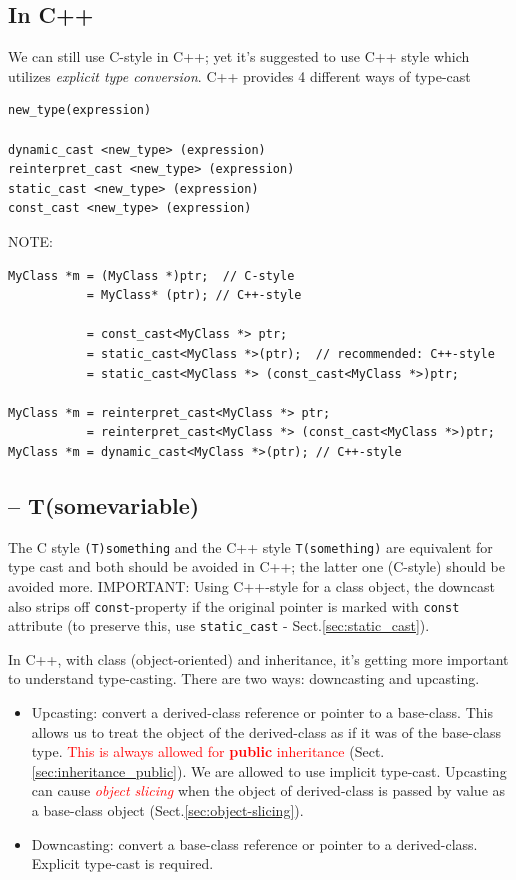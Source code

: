\subsection{In C++}
\label{sec:type-cast-C++}

We can still use C-style in C++; yet it's suggested to use C++ style which
utilizes {\it explicit type conversion}. C++ provides 4 different ways of
type-cast
\begin{Verbatim}
new_type(expression)
    
dynamic_cast <new_type> (expression)
reinterpret_cast <new_type> (expression)
static_cast <new_type> (expression)
const_cast <new_type> (expression)
 \end{Verbatim}

NOTE:
\begin{Verbatim}
MyClass *m = (MyClass *)ptr;  // C-style
           = MyClass* (ptr); // C++-style

           = const_cast<MyClass *> ptr; 
           = static_cast<MyClass *>(ptr);  // recommended: C++-style 
           = static_cast<MyClass *> (const_cast<MyClass *>)ptr;
           
MyClass *m = reinterpret_cast<MyClass *> ptr;
           = reinterpret_cast<MyClass *> (const_cast<MyClass *>)ptr;
MyClass *m = dynamic_cast<MyClass *>(ptr); // C++-style
\end{Verbatim}

\subsection{-- T(somevariable)}

The C style \verb!(T)something! and the C++ style \verb!T(something)! are
equivalent for type cast and both should be avoided in C++; the latter one
(C-style) should be avoided more.  IMPORTANT: Using C++-style for a class
object, the downcast also strips off \verb!const!-property if the original
pointer is marked with \verb!const! attribute (to preserve this, use
\verb!static_cast! - Sect.\ref{sec:static_cast}).


In C++, with class (object-oriented) and inheritance, it's getting more
important to understand type-casting. There are two ways: downcasting and
upcasting.
\begin{itemize}
  \item Upcasting: convert a derived-class reference or pointer to a base-class.
  This allows us to treat the object of the derived-class as if it was of the
  base-class type. \textcolor{red}{This is always allowed for {\bf public}
  inheritance} (Sect.\ref{sec:inheritance_public}).  We are allowed to use
  implicit type-cast. Upcasting can cause \textcolor{red}{\it object slicing}
  when the object of derived-class is passed by value as a base-class object
  (Sect.\ref{sec:object-slicing}).
  
  \item Downcasting: convert a base-class reference or pointer to a
  derived-class. Explicit type-cast is required. 
\end{itemize}


